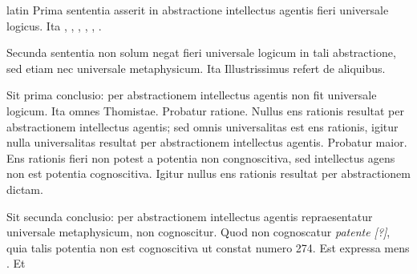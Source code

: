 \begin{otherlanguage*}{latin}
\pstart
Prima sententia asserit in abstractione intellectus agentis fieri universale logicus. Ita , , , , , . 
\pend

\pstart
Secunda sententia non solum negat fieri universale logicum in tali abstractione, sed etiam nec universale metaphysicum. Ita Illustrissimus  refert de aliquibus. 
\pend

\pstart
Sit prima conclusio:
per abstractionem intellectus agentis non fit universale logicum. Ita omnes Thomistae. Probatur ratione. Nullus ens rationis resultat per abstractionem intellectus agentis; sed omnis universalitas est ens rationis, igitur nulla universalitas resultat per abstractionem intellectus agentis. Probatur maior. Ens rationis fieri non potest a potentia non congnoscitiva, sed intellectus agens non est potentia cognoscitiva. Igitur nullus ens rationis resultat per abstractionem dictam. 
\pend

\pstart
Sit secunda conclusio:
per abstractionem intellectus agentis repraesentatur universale metaphysicum, non cognoscitur. Quod non cognoscatur \emph{patente [?]}, quia talis potentia non est cognoscitiva ut constat numero 274. Est expressa mens . Et  
\pend


\end{otherlanguage*}
